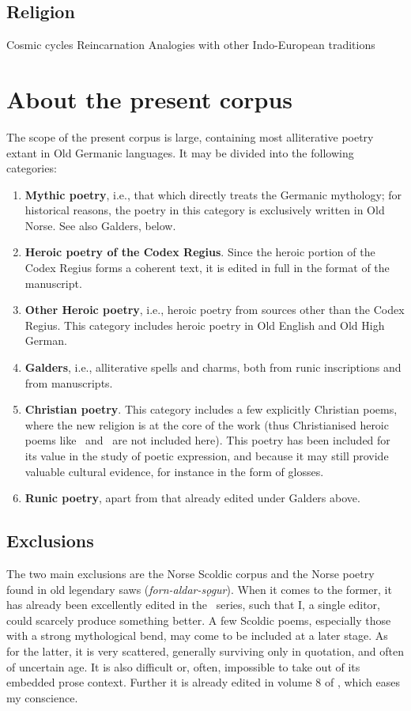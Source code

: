   \subsection{Religion}
    Cosmic cycles
    Reincarnation
    Analogies with other Indo-European traditions

\section{About the present corpus}
  The scope of the present corpus is large, containing most alliterative poetry extant in Old Germanic languages.  It may be divided into the following categories:
  \begin{enumerate}
    \item \textbf{Mythic poetry}, i.e., that which directly treats the Germanic mythology; for historical reasons, the poetry in this category is exclusively written in Old Norse.  See also Galders, below.
    \item \textbf{Heroic poetry of the Codex Regius}.  Since the heroic portion of the Codex Regius forms a coherent text, it is edited in full in the format of the manuscript.
    \item \textbf{Other Heroic poetry}, i.e., heroic poetry from sources other than the Codex Regius.  This category includes heroic poetry in Old English and Old High German.
    \item \textbf{Galders}, i.e., alliterative spells and charms, both from runic inscriptions and from manuscripts.
    \item \textbf{Christian poetry}.  This category includes a few explicitly Christian poems, where the new religion is at the core of the work (thus Christianised heroic poems like \Beowulf\ and \Hildebrandslied\ are not included here).  This poetry has been included for its value in the study of poetic expression, and because it may still provide valuable cultural evidence, for instance in the form of glosses.
    \item \textbf{Runic poetry}, apart from that already edited under Galders above.
  \end{enumerate}

  \subsection{Exclusions}
    The two main exclusions are the Norse Scoldic corpus and the Norse poetry found in old legendary saws (\emph{forn-aldar-sǫgur}).  When it comes to the former, it has already been excellently edited in the \SkP\ series, such that I, a single editor, could scarcely produce something better.  A few Scoldic poems, especially those with a strong mythological bend, may come to be included at a later stage.  As for the latter, it is very scattered, generally surviving only in quotation, and often of uncertain age.  It is also difficult or, often, impossible to take out of its embedded prose context.  Further it is already edited in volume 8 of \SkP, which eases my conscience.

